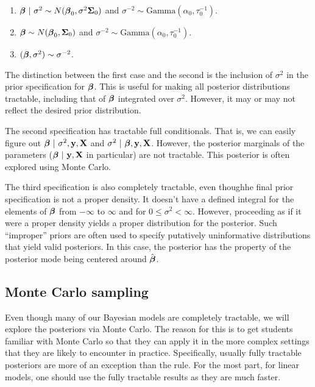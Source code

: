 \begin{enumerate}
\item $\boldsymbol{\beta} ~|~ \sigma^2 \sim N(\boldsymbol{\beta}_0, \sigma^2 \boldsymbol{\Sigma}_0)$ and $\sigma^{-2} \sim \mbox{Gamma}(\alpha_0, \tau^{-1}_0)$.
\item $\boldsymbol{\beta} \sim N(\boldsymbol{\beta}_0, \boldsymbol{\Sigma}_0)$ and $\sigma^{-2} \sim \mbox{Gamma}(\alpha_0, \tau^{-1}_0)$.
\item $(\boldsymbol{\beta}, \sigma^2) \sim \sigma^{-2}$.
\end{enumerate}


The distinction between the first case and the second is the inclusion of $\sigma^2$ in
the prior specification for $\boldsymbol{\beta}$. This is useful for making all posterior distributions
tractable, including that of $\boldsymbol{\beta}$ integrated over $\sigma^2$. However, it may or may
not reflect the desired prior distribution. 

The second specification has tractable full conditionals. That is, we can easily figure out
$\boldsymbol{\beta} ~|~ \sigma^2, \mathbf{y}, \mathbf{X}$ and $\sigma^2 ~|~ \boldsymbol{\beta}, \mathbf{y}, \mathbf{X}$. However, the posterior
marginals of the parameters ($\boldsymbol{\beta} ~|~ \mathbf{y}, \mathbf{X}$ in particular) are not tractable. This posterior
is often explored using Monte Carlo.

The third specification is also completely tractable, even thoughhe final prior specification is not a proper density. It doesn't have a defined integral for
the elements of $\boldsymbol{\beta}$ from $-\infty$ to $\infty$ and for $0\leq \sigma^2 < \infty$. However,
proceeding as if it were a proper density yields a proper distribution for the posterior. 
Such ``improper'' priors are often used to specify putatively uninformative distributions that
yield valid posteriors. In this case, the posterior has the property of the posterior mode
being centered around $\hat {\boldsymbol{\beta}}$. 


\subsection{Monte Carlo sampling}

Even though many of our Bayesian models are completely tractable, we will explore the posteriors
via Monte Carlo. The reason for this is to get students familiar with Monte Carlo so that they
can apply it in the more complex settings that they are likely to encounter in practice. 
Specifically, usually fully tractable posteriors are more of an exception than the rule. For the
most part, for linear models, one should use the fully tractable results as they are much faster.

